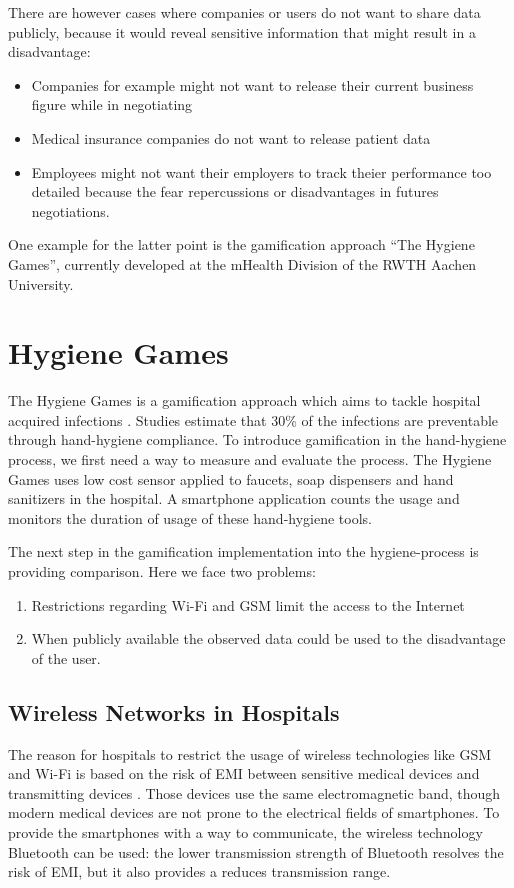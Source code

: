 There are however cases where companies or users do not want to share data publicly, because it would reveal sensitive information that might result in a disadvantage:
\begin{itemize}
	\item Companies for example might not want to release their current business figure while in negotiating
	\item Medical insurance companies do not want to release patient data
	\item Employees might not want their employers to track theier performance too detailed because the fear repercussions or disadvantages in futures negotiations.
\end{itemize}

One example for the latter point is the gamification approach ``The Hygiene Games'', currently developed at the mHealth Division of the RWTH Aachen University.

\section{Hygiene Games} \label{Hygiene Games}

The Hygiene Games is a gamification approach which aims to tackle hospital acquired infections \autocite{Klein2016}. Studies estimate that 30\% of the infections are preventable through hand-hygiene compliance. To introduce gamification in the hand-hygiene process, we first need a way to measure and evaluate the process. The Hygiene Games uses low cost sensor applied to faucets, soap dispensers and hand sanitizers in the hospital. A smartphone application counts the usage and monitors the duration of usage of these hand-hygiene tools.

The next step in the gamification implementation into the hygiene-process is providing comparison. Here we face two problems:
\begin{enumerate}
	\item Restrictions regarding Wi-Fi and \gls{GSM} limit the access to the Internet
	\item When publicly available the observed data could be used to the disadvantage of the user.
\end{enumerate}

\subsection{Wireless Networks in Hospitals} \label{Wireless Networks in Hospitals}
The reason for hospitals to restrict the usage of wireless technologies like \gls{GSM} and Wi-Fi is based on the risk of \gls{EMI} between sensitive medical devices and transmitting devices \autocite{Ishihara2014}. Those devices use the same electromagnetic band, though modern medical devices are not prone to the electrical fields of smartphones.
To provide the smartphones with a way to communicate, the wireless technology Bluetooth can be used: the lower transmission strength of Bluetooth resolves the risk of \gls{EMI}, but it also provides a reduces transmission range.


